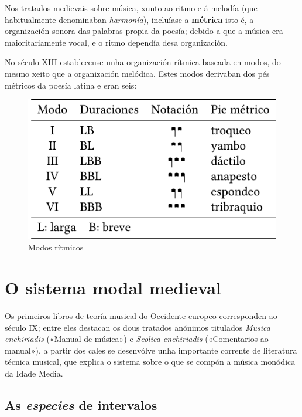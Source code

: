 \documentclass[a4paper, twoside]{templates/ociamthesis}
\begin{document}
Nos tratados medievais sobre música, xunto ao ritmo e á melodía (que habitualmente denominaban \emph{harmonía}), incluíase a \textbf{métrica} isto é, a organización sonora das palabras propia da poesía; debido a que a música era maioritariamente vocal, e o ritmo dependía desa organización.

No século XIII estableceuse unha organización rítmica baseada en modos, do mesmo xeito que a organización melódica. Estes modos derivaban dos pés métricos da poesía latina e eran seis:

\begin{figure}
\centering
\includegraphics{figures/ud-03/modosritmicos.png}
\caption{Modos rítmicos}
\end{figure}

\hypertarget{o-sistema-modal-medieval}{%
\section{O sistema modal medieval}\label{o-sistema-modal-medieval}}

Os primeiros libros de teoría musical do Occidente europeo corresponden ao século IX; entre eles destacan os dous tratados anónimos titulados \emph{Musica enchiriadis} («Manual de música») e \emph{Scolica enchiriadis} («Comentarios ao manual»), a partir dos cales se desenvólve unha importante corrente de literatura técnica musical, que explica o sistema sobre o que se compón a música monódica da Idade Media.

\hypertarget{as-especies-de-intervalos}{%
\subsection{\texorpdfstring{As \emph{especies} de intervalos}{As especies de intervalos}}\label{as-especies-de-intervalos}}
\end{document}
